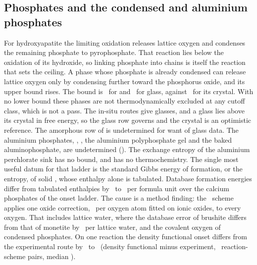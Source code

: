 \subsection{Phosphates and the condensed and aluminium phosphates}\label{sec:res-phosphate}\label{sec:res-condensed}
For hydroxyapatite the limiting oxidation releases lattice oxygen and condenses the remaining phosphate to pyrophosphate. %
That reaction lies below the oxidation of its hydroxide, so linking phosphate into chains is itself the reaction that sets the ceiling. %
A phase whose phosphate is already condensed can release lattice oxygen only by condensing further toward the phosphorus oxide, and its upper bound rises. %
The bound is \NumPyroOnset\ for  and \NumMetaGlassOnset\ for  glass, against \NumMetaCrystalOnset\ for its crystal. %
With no lower bound these phases are not thermodynamically excluded at any cutoff class, which is not a pass. %
The in-situ routes give glasses, and a glass lies above its crystal in free energy, so the glass row governs and the crystal is an optimistic reference. %
The amorphous row of  is undetermined for want of glass data. %
The aluminium phosphates, , , the aluminium polyphosphate gel and the baked aluminophosphate, are undetermined (). %
The exchange entropy of the aluminium perchlorate sink has no bound, and  has no thermochemistry. %
The single most useful datum for that ladder is the standard Gibbs energy of formation, or the entropy, of solid , whose enthalpy alone is tabulated. %
Database formation energies differ from tabulated enthalpies by \NumDftCaPhosLow\ to \NumDftCaPhosHigh\ per formula unit over the calcium phosphates of the onset ladder. %
The cause is a method finding: the \NumMpCorrectionScheme\ scheme applies one oxide correction, \NumMpOxideCorr\ per oxygen atom fitted on ionic oxides, to every oxygen. %
That includes lattice water, where the database error of brushite differs from that of monetite by \NumBrushiteWaterExcess\ per lattice water, and the covalent oxygen of condensed phosphates. %
On one reaction the density functional onset differs from the experimental route by \NumDftOnsetSpreadLow\ to \NumDftOnsetSpreadHigh\ (density functional minus experiment, \NumDftOnsetPairs\ reaction-scheme pairs, median \NumDftOnsetMedian). %
